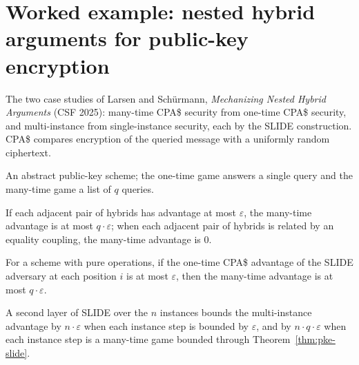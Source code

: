 \chapter{Worked example: nested hybrid arguments for public-key encryption}

The two case studies of Larsen and Schürmann, \emph{Mechanizing Nested Hybrid
Arguments} (CSF 2025): many-time CPA\$ security from one-time CPA\$ security, and
multi-instance from single-instance security, each by the SLIDE construction.
CPA\$ compares encryption of the queried message with a uniformly random
ciphertext.

\begin{definition}
  \label{def:pke-cpad}
  \leanok
  An abstract public-key scheme; the one-time game answers a single query and the
  many-time game a list of $q$ queries.
\end{definition}

\begin{theorem}
  \label{thm:pke-mt-bound}
  \leanok
  If each adjacent pair of hybrids has advantage at most $\varepsilon$, the
  many-time advantage is at most $q \cdot \varepsilon$; when each adjacent pair
  of hybrids is related by an equality coupling, the many-time advantage is $0$.
\end{theorem}

\begin{theorem}
  \label{thm:pke-slide}
  \leanok
  For a scheme with pure operations, if the one-time CPA\$ advantage of the SLIDE
  adversary at each position $i$ is at most $\varepsilon$, then the many-time
  advantage is at most $q \cdot \varepsilon$.
\end{theorem}

\begin{theorem}
  \label{thm:pke-mi}
  \leanok
  A second layer of SLIDE over the $n$ instances bounds the multi-instance
  advantage by $n \cdot \varepsilon$ when each instance step is bounded by
  $\varepsilon$, and by $n \cdot q \cdot \varepsilon$ when each instance step is a
  many-time game bounded through Theorem~\ref{thm:pke-slide}.
\end{theorem}
